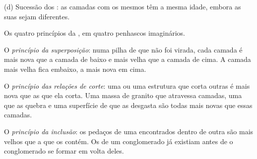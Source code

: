 \begin{omfigure}
\begin{minipage}[t]{0.49\linewidth}
{\small (d) Sucessão dos : as camadas com os mesmos  têm a
mesma idade, embora as suas  sejam diferentes.}
\end{minipage}

\medskip
{\small Os quatro princípios da , em quatro penhascos
imaginários.}
\label{fig:g7:geological-time:principles}
\end{omfigure}

\begin{definition}\label{def:g7:geological-time:superposition}
O \emph{princípio da superposição}:
numa pilha de  que não foi virada, cada camada é mais
nova que a camada de baixo e mais velha que a camada de cima. A camada
mais velha fica embaixo, a mais nova em cima.
\end{definition}

\begin{definition}\label{def:g7:geological-time:cross-cutting}
O \emph{princípio das relações de corte}: uma  ou uma estrutura que corta
outras  é mais nova que as  que ela corta. Uma massa de
granito que atravessa camadas, uma  que as quebra e uma superfície
de  que as desgasta são todas mais novas que essas camadas.
\end{definition}

\begin{definition}\label{def:g7:geological-time:inclusion}
O \emph{princípio da inclusão}: os pedaços
de uma  encontrados dentro de outra  são mais velhos que a
 que os contém. Os  de um conglomerado já existiam antes de o
conglomerado se formar em volta deles.
\end{definition}

